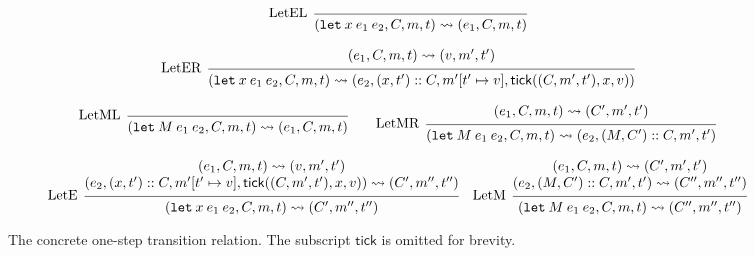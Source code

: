 \documentclass{article}
\theoremstyle{definition}
\newcommand*{\cons}{::}
\newcommand*{\mem}{m}
\newcommand*{\semarrow}{\rightsquigarrow}
\newcommand*{\tick}{\mathsf{tick}}
\begin{document}
\begin{figure}[h!]
  \[
    \begin{prooftree}
      \infer[left label=LetEL]0{
      (\mathtt{let}\:x\:e_1\:e_2, C, \mem, t)
      \semarrow
      (e_{1}, C, \mem, t)
      }
    \end{prooftree}
  \]

  \[
    \begin{prooftree}
      \hypo{
        \begin{matrix}
          (e_{1}, C, \mem, t)
          \semarrow
          (v, \mem', t')
        \end{matrix}
      }
      \infer[left label=LetER]1{
      (\mathtt{let}\:x\:e_1\:e_2, C, \mem, t)
      \semarrow
      (e_{2}, (x, t')\cons C, \mem'[t'\mapsto v], \tick((C,\mem',t'),x,v))
      }
    \end{prooftree}
  \]

  \[
    \begin{prooftree}
      \infer[left label=LetML]0{
      (\mathtt{let}\:M\:e_{1}\:e_{2}, C, \mem, t)
      \semarrow
      (e_{1}, C, \mem, t)
      }
    \end{prooftree}\qquad
    \begin{prooftree}
      \hypo{
        \begin{matrix}
          (e_{1}, C, \mem, t)
          \semarrow
          (C', \mem', t')
        \end{matrix}
      }
      \infer[left label=LetMR]1{
      (\mathtt{let}\:M\:e_{1}\:e_{2}, C, \mem, t)
      \semarrow
      (e_{2}, (M, C')\cons C, \mem', t')
      }
    \end{prooftree}
  \]

  \[
    \begin{prooftree}
      \hypo{
        \begin{matrix}
          (e_{1}, C, \mem, t)
          \semarrow
          (v, \mem', t') \\
          (e_{2}, (x, t')\cons C, \mem'[t'\mapsto v], \tick((C,\mem',t'),x,v))
          \semarrow
          (C', \mem'', t'')
        \end{matrix}
      }
      \infer[left label=LetE]1{
      (\mathtt{let}\:x\:e_1\:e_2, C, \mem, t)
      \semarrow
      (C', \mem'', t'')
      }
    \end{prooftree}\quad
    \begin{prooftree}
      \hypo{
        \begin{matrix}
          (e_{1}, C, \mem, t)
          \semarrow
          (C', \mem', t') \\
          (e_{2}, (M, C')\cons C, \mem', t')
          \semarrow
          (C'', \mem'', t'')
        \end{matrix}
      }
      \infer[left label=LetM]1{
      (\mathtt{let}\:M\:e_{1}\:e_{2}, C, \mem, t)
      \semarrow
      (C'', \mem'', t'')
      }
    \end{prooftree}
  \]
  \caption{The concrete one-step transition relation. The subscript $\tick$ is omitted for brevity.}
  \label{fig:concreach}
\end{figure}
\end{document}
